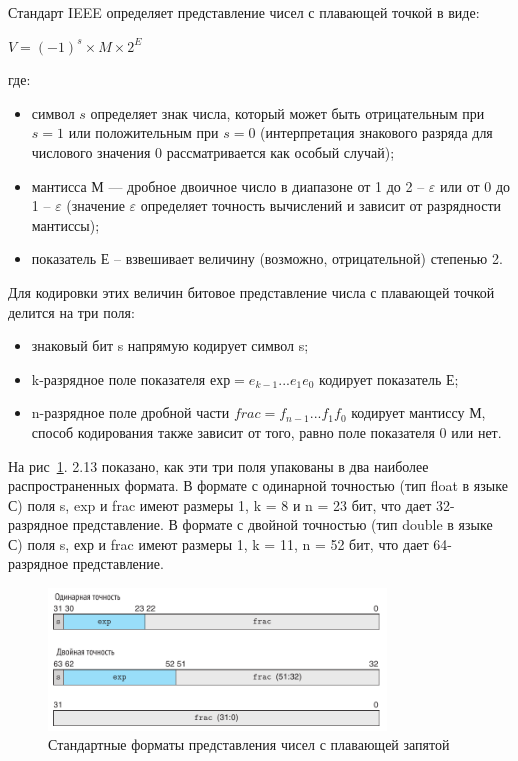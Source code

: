 Стандарт IEEE определяет представление чисел с плавающей точкой в виде:
\begin{center}
    \large{$V = (-1)^s × M × 2^E$}
\end{center}
где:
\begin{itemize}
    \item символ $s$ определяет знак числа, который может быть отрицательным при $s = 1$ или положительным при $s = 0$ (интерпретация знакового разряда для числового значения 0 рассматривается как особый случай);
    \item мантисса М --- дробное двоичное число в диапазоне от 1 до 2 – $\varepsilon$ или от 0  до 1 – $\varepsilon$ (значение $\varepsilon$ определяет точность вычислений и зависит от разрядности мантиссы);
    \item показатель Е – взвешивает величину (возможно, отрицательной)  степенью 2.
\end{itemize}

Для кодировки этих величин битовое представление числа с плавающей точкой делится на три поля:

\begin{itemize}
    \item знаковый бит s напрямую кодирует символ s;
    \item k-разрядное поле показателя $ехр = e_{k-1} ... e_1e_0$ кодирует показатель Е;
    \item n-разрядное поле дробной части $frac = f_{n-1} ... f_1f_0$ кодирует мантиссу М, способ кодирования также зависит от того, равно поле показателя 0 или нет.
\end{itemize}

На рис~\ref{data01}. 2.13 показано, как эти три поля упакованы в два наиболее распространенных формата. В формате с одинарной точностью (тип float в языке С) поля s, exp и frac имеют размеры 1, k = 8 и n = 23 бит, что дает 32-разрядное представление. В формате с двойной точностью (тип double в языке С) поля s, ехр и frac имеют размеры 1, k = 11, n = 52 бит, что дает 64-разрядное представление.

\begin{figure}[htbp]
    \centering
    \includegraphics[width=0.8\textwidth]{img/data01.png}
    \caption{Стандартные форматы представления чисел с плавающей запятой}
    \label{data01}
\end{figure}

